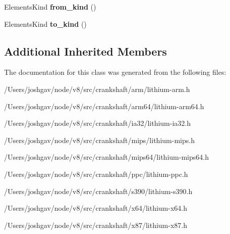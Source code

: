 \begin{DoxyCompactItemize}
\item 
Elements\+Kind {\bfseries from\+\_\+kind} ()\hypertarget{classv8_1_1internal_1_1_l_transition_elements_kind_af634084f5d3f05e0700cc8d35a797465}{}\label{classv8_1_1internal_1_1_l_transition_elements_kind_af634084f5d3f05e0700cc8d35a797465}

\item 
Elements\+Kind {\bfseries to\+\_\+kind} ()\hypertarget{classv8_1_1internal_1_1_l_transition_elements_kind_a131f478caf0a117639ee35cd0bdeed59}{}\label{classv8_1_1internal_1_1_l_transition_elements_kind_a131f478caf0a117639ee35cd0bdeed59}

\end{DoxyCompactItemize}
\subsection*{Additional Inherited Members}


The documentation for this class was generated from the following files\+:\begin{DoxyCompactItemize}
\item 
/\+Users/joshgav/node/v8/src/crankshaft/arm/lithium-\/arm.\+h\item 
/\+Users/joshgav/node/v8/src/crankshaft/arm64/lithium-\/arm64.\+h\item 
/\+Users/joshgav/node/v8/src/crankshaft/ia32/lithium-\/ia32.\+h\item 
/\+Users/joshgav/node/v8/src/crankshaft/mips/lithium-\/mips.\+h\item 
/\+Users/joshgav/node/v8/src/crankshaft/mips64/lithium-\/mips64.\+h\item 
/\+Users/joshgav/node/v8/src/crankshaft/ppc/lithium-\/ppc.\+h\item 
/\+Users/joshgav/node/v8/src/crankshaft/s390/lithium-\/s390.\+h\item 
/\+Users/joshgav/node/v8/src/crankshaft/x64/lithium-\/x64.\+h\item 
/\+Users/joshgav/node/v8/src/crankshaft/x87/lithium-\/x87.\+h\end{DoxyCompactItemize}
